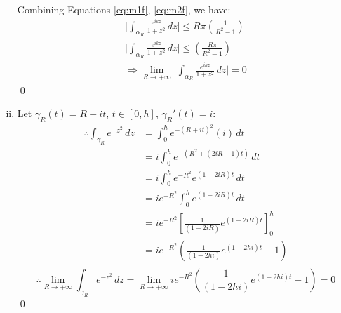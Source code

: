 \documentclass[a4paper, titlepage, DIV=14]{scrartcl}
\begin{document}
\begin{enumerate}[i)]
        Combining Equations \autoref{eq:m1f}, \autoref{eq:m2f}, we have:
        \begin{gather*}
            \Big|\int_{\alpha_{R}} \frac{e^{ikz}}{1+z^{2}} \, dz\Big| \leq R\pi(\frac{1}{R^{2}-1}) \\
            \Big|\int_{\alpha_{R}} \frac{e^{ikz}}{1+z^{2}} \, dz\Big| \leq (\frac{R\pi}{R^{2}-1}) \\
            \Rightarrow \lim_{R \to +\infty} \Big|\int_{\alpha_{R}} \frac{e^{ikz}}{1+z^{2}} \, dz\Big| = 0 
        \end{gather*}\qed
    
        

        \item Let $\gamma_{R}(t) = R + it, \, t\in[0,h]$, $\gamma_{R}'(t) = i$:
        \begin{align*}
            \therefore \int_{\gamma_{R}}e^{-z^{2}} \, dz &= \int_{0}^{h}e^{-(R+it)^{2}}(i) \, dt \\
                &= i\int_{0}^{h}e^{-(R^{2} + (2iR-1)t)} \, dt \\
                &= i\int_{0}^{h}e^{-R^{2}}e^{(1-2iR)t} \, dt \\
                &= ie^{-R^{2}}\int_{0}^{h}e^{(1-2iR)t} \, dt \\
                &= ie^{-R^{2}} [\frac{1}{(1-2iR)}e^{(1-2iR)t}]^{h}_{0} \\
                &= ie^{-R^{2}} (\frac{1}{(1-2hi)}e^{(1-2hi)t} - 1) \\
        \end{align*}
        \begin{equation*}
            \therefore \lim_{R \to +\infty}\int_{\gamma_{R}}e^{-z^{2}} \, dz = \lim_{R \to +\infty} ie^{-R^{2}} (\frac{1}{(1-2hi)}e^{(1-2hi)t} - 1) = 0
        \end{equation*} \qed

    \end{enumerate}
\end{document}
